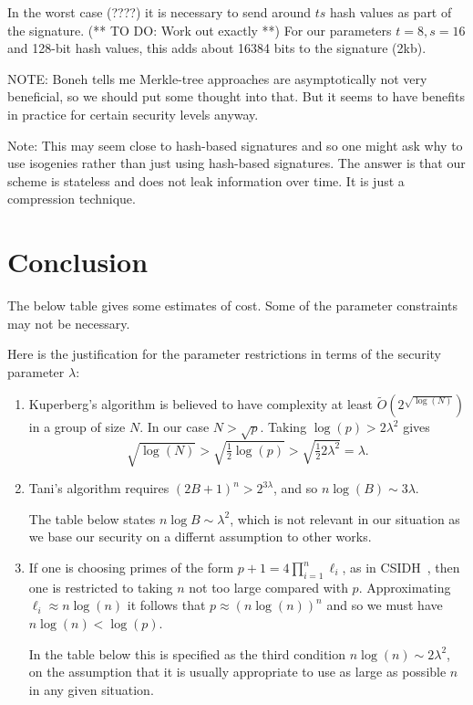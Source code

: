 \documentclass{llncs}
\begin{document}
In the worst case (????)
it is necessary to send around $ts$ hash values as part of the signature.
(** TO DO: Work out exactly **)
For our parameters $t=8, s=16$ and 128-bit hash values, this adds about 16384 bits to the signature (2kb).




NOTE: Boneh tells me Merkle-tree approaches are asymptotically not very beneficial, so we should put some thought into that. But it seems to have benefits in practice for certain security levels anyway.



Note: This may seem close to hash-based signatures and so one might ask why to use isogenies rather than just using hash-based signatures. The answer is that our scheme is stateless and does not leak information over time. It is just a compression technique.



\section{Conclusion}


The below table gives some estimates of cost.
Some of the parameter constraints may not be necessary.


Here is the justification for the parameter restrictions in terms of the security parameter $\lambda$:
\begin{enumerate}
\item Kuperberg's algorithm is believed to have complexity at least $\tilde{O}( 2^{\sqrt{\log(N)}} )$ in a group of size $N$. In our case $N > \sqrt{p}$. Taking $\log(p) > 2 \lambda^2$ gives 
\[
   \sqrt{ \log(N)} > \sqrt{ \tfrac{1}{2} \log(p) } > \sqrt{ \tfrac{1}{2} 2 \lambda^2 } = \lambda.
\]
\item Tani's algorithm requires $(2B+1)^n > 2^{3 \lambda}$, and so $n \log(B) \sim 3 \lambda$.

The table below states  $n\log B\sim \lambda^2$, which is not relevant in our situation as we base our security on a differnt assumption to other works.


\item If one is choosing primes of the form $p+1 = 4\prod_{i=1}^n\ell_i$, as in CSIDH~\cite{CLMPR18}, then one is restricted to taking $n$ not too large compared with $p$.
Approximating $\ell_i \approx n \log(n)$ it follows that $p \approx (n \log(n))^n$ and so we must have $n \log(n) < \log(p)$.

In the table below this is specified as the third condition $n \log(n) \sim 2 \lambda^2$, on the assumption that it is usually appropriate to use as large as possible $n$ in any given situation.
\end{enumerate}
\end{document}
